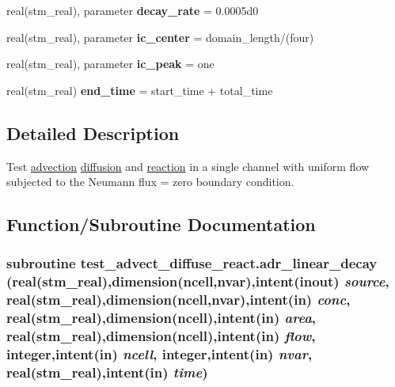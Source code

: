 \begin{CompactItemize}
\item 
\hypertarget{a00074_f6effc2bffb759c612542375be25e5cc}{
real(stm\_\-real), parameter \textbf{decay\_\-rate} = 0.0005d0}
\label{a00074_f6effc2bffb759c612542375be25e5cc}

\item 
\hypertarget{a00074_253b67779f62f3211f282f6258e68210}{
real(stm\_\-real), parameter \textbf{ic\_\-center} = domain\_\-length/(four)}
\label{a00074_253b67779f62f3211f282f6258e68210}

\item 
\hypertarget{a00074_f3e423e6adae4c3a5405e0132ca18ade}{
real(stm\_\-real), parameter \textbf{ic\_\-peak} = one}
\label{a00074_f3e423e6adae4c3a5405e0132ca18ade}

\item 
\hypertarget{a00074_1f0ea8ecafd8961858d8b0929b503081}{
real(stm\_\-real) \textbf{end\_\-time} = start\_\-time + total\_\-time}
\label{a00074_1f0ea8ecafd8961858d8b0929b503081}

\end{CompactItemize}


\subsection{Detailed Description}
Test \hyperlink{a00052}{advection} \hyperlink{a00056}{diffusion} and \hyperlink{a00068}{reaction} in a single channel with uniform flow subjected to the Neumann flux = zero boundary condition. 



\subsection{Function/Subroutine Documentation}
\hypertarget{a00074_f699fd0394ef700425a90d7805215578}{
\subsubsection[{adr\_\-linear\_\-decay}]{\setlength{\rightskip}{0pt plus 5cm}subroutine test\_\-advect\_\-diffuse\_\-react.adr\_\-linear\_\-decay (real(stm\_\-real),dimension(ncell,nvar),intent(inout) {\em source}, \/  real(stm\_\-real),dimension(ncell,nvar),intent(in) {\em conc}, \/  real(stm\_\-real),dimension(ncell),intent(in) {\em area}, \/  real(stm\_\-real),dimension(ncell),intent(in) {\em flow}, \/  integer,intent(in) {\em ncell}, \/  integer,intent(in) {\em nvar}, \/  real(stm\_\-real),intent(in) {\em time})}}
\label{a00074_f699fd0394ef700425a90d7805215578}


